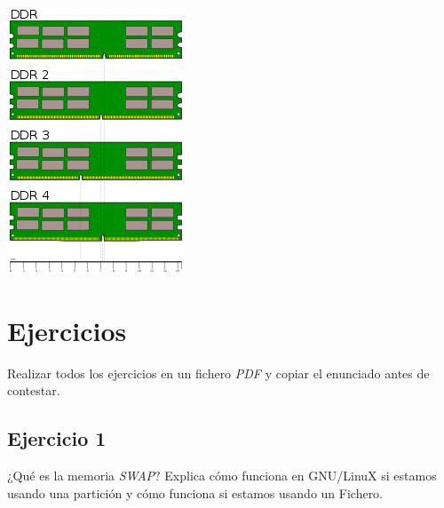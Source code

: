 \documentclass[11pt]{article}
\begin{document}
\begin{center}
\includegraphics[width=.9\linewidth]{./imgs/DDR.png}
\end{center}

\section{Ejercicios}
\label{sec:org30cc413}

Realizar todos los ejercicios en un fichero \emph{PDF} y copiar el enunciado antes de
contestar.

\subsection{Ejercicio 1}
\label{sec:orgb3ebe03}

¿Qué es la memoria \emph{SWAP}? Explica cómo funciona en GNU/LinuX si estamos usando
una partición y cómo funciona si estamos usando un Fichero.
\end{document}

